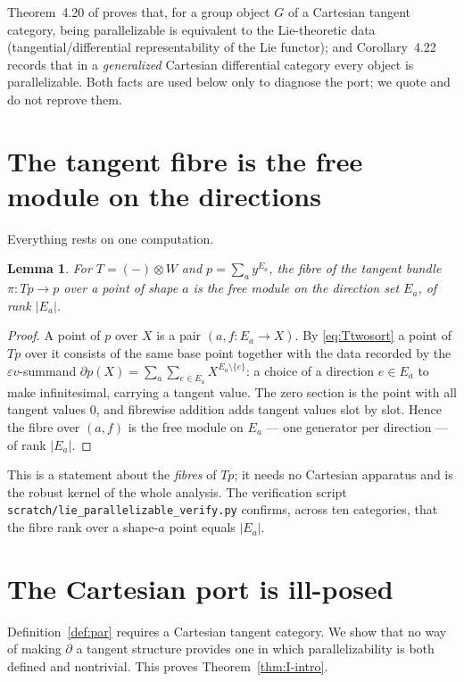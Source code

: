 \documentclass[11pt]{article}
\newtheorem{lemma}[theorem]{Lemma}
\theoremstyle{definition}
\begin{document}
Theorem~4.20 of \cite{Lanfranchi2026} proves that, for a group object $G$ of a Cartesian tangent
category, being parallelizable is equivalent to the Lie-theoretic data (tangential/differential
representability of the Lie functor); and Corollary~4.22 records that in a \emph{generalized}
Cartesian differential category every object is parallelizable. Both facts are used below only to
diagnose the port; we quote and do not reprove them.

\section{The tangent fibre is the free module on the directions}\label{sec:fibre}

Everything rests on one computation.

\begin{lemma}\label{lem:fibre}
For $T=(-)\otimes W$ and $p=\sum_a y^{E_a}$, the fibre of the tangent bundle
$\pi\colon Tp\to p$ over a point of shape $a$ is the free module on the direction set $E_a$, of
rank $|E_a|$.
\end{lemma}

\begin{proof}
A point of $p$ over $X$ is a pair $(a, f\colon E_a\to X)$. By \eqref{eq:Ttwosort} a point of $Tp$
over it consists of the same base point together with the data recorded by the
$\varepsilon v$-summand
$\partial p(X)=\sum_a\sum_{e\in E_a}X^{E_a\setminus\{e\}}$: a choice of a direction $e\in E_a$ to
make infinitesimal, carrying a tangent value. The zero section is the point with all tangent
values $0$, and fibrewise addition adds tangent values slot by slot. Hence the fibre over
$(a,f)$ is the free module on $E_a$ --- one generator per direction --- of rank $|E_a|$.
\end{proof}

This is a statement about the \emph{fibres} of $Tp$; it needs no Cartesian apparatus and is the
robust kernel of the whole analysis. The verification script
\texttt{scratch/lie\_parallelizable\_verify.py} confirms, across ten categories, that the fibre
rank over a shape-$a$ point equals $|E_a|$.

\section{The Cartesian port is ill-posed}\label{sec:refutation}

Definition~\ref{def:par} requires a Cartesian tangent category. We show that no way of making
$\partial$ a tangent structure provides one in which parallelizability is both defined and
nontrivial. This proves Theorem~\ref{thm:I-intro}.
\end{document}
